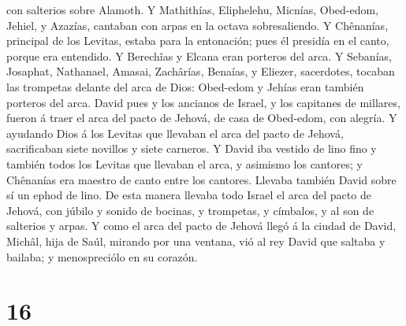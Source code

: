 con salterios sobre Alamoth.  Y Mathithías, Eliphelehu,
Micnías, Obed-edom, Jehiel, y Azazías, cantaban con arpas en la octava
sobresaliendo.  Y Chênanías, principal de los Levitas,
estaba para la entonación; pues él presidía en el canto, porque era
entendido.  Y Berechîas y Elcana eran porteros del arca.
 Y Sebanías, Josaphat, Nathanael, Amasai, Zachârías,
Benaías, y Eliezer, sacerdotes, tocaban las trompetas delante del arca
de Dios: Obed-edom y Jehías eran también porteros del arca.
 David pues y los ancianos de Israel, y los capitanes de
millares, fueron á traer el arca del pacto de Jehová, de casa de
Obed-edom, con alegría.  Y ayudando Dios á los Levitas
que llevaban el arca del pacto de Jehová, sacrificaban siete novillos y
siete carneros.  Y David iba vestido de lino fino y
también todos los Levitas que llevaban el arca, y asimismo los cantores;
y Chênanías era maestro de canto entre los cantores. Llevaba también
David sobre sí un ephod de lino.  De esta manera llevaba
todo Israel el arca del pacto de Jehová, con júbilo y sonido de bocinas,
y trompetas, y címbalos, y al son de salterios y arpas. 
Y como el arca del pacto de Jehová llegó á la ciudad de David, Michâl,
hija de Saúl, mirando por una ventana, vió al rey David que saltaba y
bailaba; y menospreciólo en su corazón.

\hypertarget{section-15}{%
\section{16}\label{section-15}}

